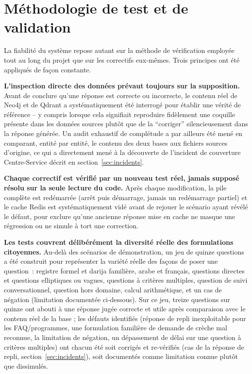 \section{Méthodologie de test et de validation}

La fiabilité du système repose autant sur la méthode de vérification employée tout au long du projet que sur les correctifs eux-mêmes. Trois principes ont été appliqués de façon constante.

\textbf{L'inspection directe des données prévaut toujours sur la supposition.} Avant de conclure qu'une réponse est correcte ou incorrecte, le contenu réel de Neo4j et de Qdrant a systématiquement été interrogé pour établir une vérité de référence -- y compris lorsque cela signifiait reproduire fidèlement une coquille présente dans les données sources plutôt que de la ``corriger'' silencieusement dans la réponse générée. Un audit exhaustif de complétude a par ailleurs été mené en comparant, entité par entité, le contenu des deux bases aux fichiers sources d'origine, ce qui a directement mené à la découverte de l'incident de couverture Centre-Service décrit en section~\ref{sec:incidents}.

\textbf{Chaque correctif est vérifié par un nouveau test réel, jamais supposé résolu sur la seule lecture du code.} Après chaque modification, la pile complète est redémarrée (arrêt puis démarrage, jamais un redémarrage partiel) et le cache Redis est systématiquement vidé avant de rejouer le scénario ayant révélé le défaut, pour exclure qu'une ancienne réponse mise en cache ne masque une régression ou ne simule à tort une correction.

\textbf{Les tests couvrent délibérément la diversité réelle des formulations citoyennes.} Au-delà des scénarios de démonstration, un jeu de quinze questions a été construit pour représenter la variété réelle des façons de poser une question~: registre formel et darija familière, arabe et français, questions directes et questions elliptiques ou vagues, questions à critères multiples, question de suivi conversationnel, question hors domaine, calcul arithmétique, et un cas de négation (limitation documentée ci-dessous). Sur ce jeu, treize questions sur quinze ont abouti à une réponse jugée correcte et utile après comparaison avec le contenu réel de la base ; les défauts identifiés (réponse de repli inexploitable pour les FAQ/programmes, une formulation familière de demande de crèche mal reconnue, la limitation de négation, un dépassement de délai sur une question à critères multiples) ont chacun été soit corrigés et re-vérifiés (cas de la réponse de repli, section~\ref{sec:incidents}), soit documentés comme limitation connue plutôt que dissimulés.
